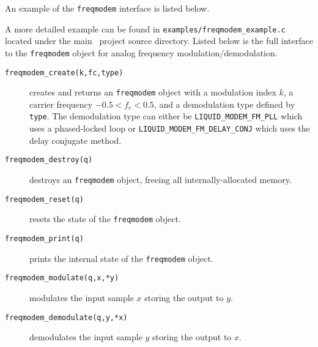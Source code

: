 An example of the {\tt freqmodem} interface is listed below.
%

%
A more detailed example can be found in
{\tt examples/freqmodem\_example.c}
located under the main \liquid\ project source directory.
Listed below is the full interface to the {\tt freqmodem} object for
analog frequency modulation/demodulation.
%
\begin{description}
\item[{\tt freqmodem\_create(k,fc,type)}]
    creates and returns an {\tt freqmodem} object with a modulation
    index $k$, a carrier frequency $-0.5 < f_c < 0.5$, and a
    demodulation type defined by {\tt type}.
    The demodulation type can either be
    {\tt LIQUID\_MODEM\_FM\_PLL} which uses a phased-locked loop or
    {\tt LIQUID\_MODEM\_FM\_DELAY\_CONJ} which uses the delay conjugate
    method.
\item[{\tt freqmodem\_destroy(q)}]
    destroys an {\tt freqmodem} object, freeing all internally-allocated
    memory.
\item[{\tt freqmodem\_reset(q)}]
    resets the state of the {\tt freqmodem} object.
\item[{\tt freqmodem\_print(q)}]
    prints the internal state of the {\tt freqmodem} object.
\item[{\tt freqmodem\_modulate(q,x,*y)}]
    modulates the input sample $x$ storing the output to $y$.
\item[{\tt freqmodem\_demodulate(q,y,*x)}]
    demodulates the input sample $y$ storing the output to $x$.
\end{description}

